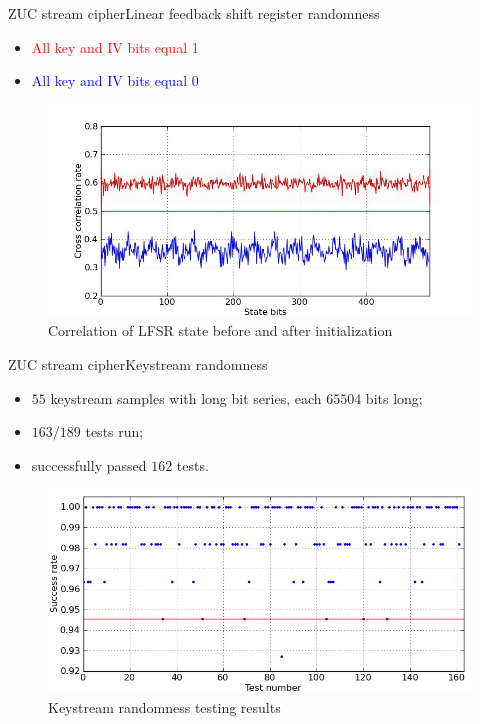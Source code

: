 \documentclass[10pt, ucs]{beamer}
\begin{document}
\begin{frame}{ZUC stream cipher}{Linear feedback shift register randomness}
    \begin{block}{}
        \begin{itemize}
            \item \textcolor{red}{All key and IV bits equal 1}
            \item \textcolor{blue}{All key and IV bits equal 0}
        \end{itemize}
    \end{block}
    \begin{figure}[htbp]
        \centering
        \includegraphics[scale=0.5]{correlation}
        \caption{Correlation of LFSR state before and after initialization}
        \label{fig:corr}
    \end{figure}
\end{frame}

\begin{frame}{ZUC stream cipher}{Keystream randomness}
    \begin{block}{}
        \begin{itemize}
            \item $55$ keystream samples with long bit series, each $65504$
                bits long;
            \item $163 / 189$ tests run;
            \item successfully passed $162$ tests.
        \end{itemize}
    \end{block}
    \begin{figure}[htbp]
        \centering
        \includegraphics[scale=0.5]{stats}
        \caption{Keystream randomness testing results}
        \label{fig:corr}
    \end{figure}
\end{frame}
\end{document}
